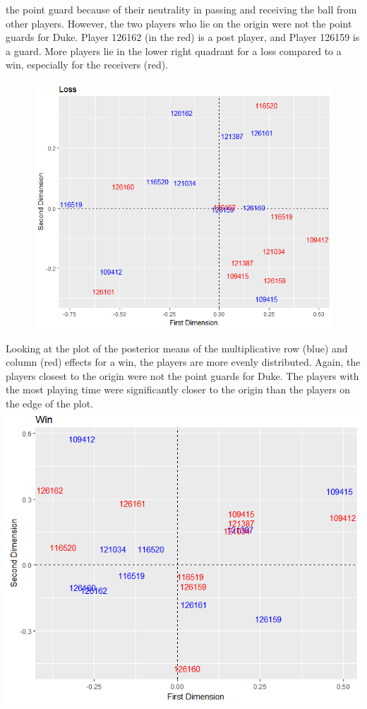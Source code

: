 \documentclass[12pt,twoside]{dukestatscithesis}
\theoremstyle{definition}
\theoremstyle{definition}
\theoremstyle{definition}
\theoremstyle{remark}
\begin{document}
the point guard because of their neutrality in passing and receiving the
ball from other players. However, the two players who lie on the origin
were not the point guards for Duke. Player 126162 (in the red) is a post
player, and Player 126159 is a guard. More players lie in the lower
right quadrant for a loss compared to a win, especially for the
receivers (red).
\begin{figure}
\centering
\includegraphics{img/uvplotloss.png}
\caption{}
\end{figure}
Looking at the plot of the posterior means of the multiplicative row
(blue) and column (red) effects for a win, the players are more evenly
distributed. Again, the players closest to the origin were not the point
guards for Duke. The players with the most playing time were
significantly closer to the origin than the players on the edge of the
plot. \includegraphics{img/uvplotwin.png}
\end{document}
